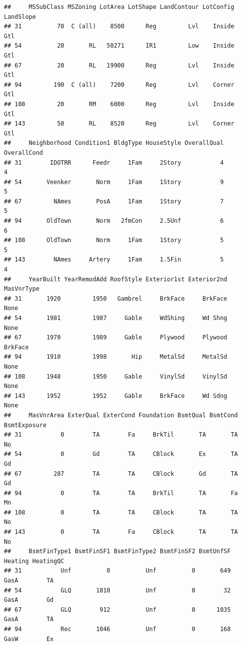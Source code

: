 \documentclass[
]{article}
\begin{document}
\begin{verbatim}
##     MSSubClass MSZoning LotArea LotShape LandContour LotConfig LandSlope
## 31          70  C (all)    8500      Reg         Lvl    Inside       Gtl
## 54          20       RL   50271      IR1         Low    Inside       Gtl
## 67          20       RL   19900      Reg         Lvl    Inside       Gtl
## 94         190  C (all)    7200      Reg         Lvl    Corner       Gtl
## 108         20       RM    6000      Reg         Lvl    Inside       Gtl
## 143         50       RL    8520      Reg         Lvl    Corner       Gtl
##     Neighborhood Condition1 BldgType HouseStyle OverallQual OverallCond
## 31        IDOTRR      Feedr     1Fam     2Story           4           4
## 54       Veenker       Norm     1Fam     1Story           9           5
## 67         NAmes       PosA     1Fam     1Story           7           5
## 94       OldTown       Norm   2fmCon     2.5Unf           6           6
## 108      OldTown       Norm     1Fam     1Story           5           5
## 143        NAmes     Artery     1Fam     1.5Fin           5           4
##     YearBuilt YearRemodAdd RoofStyle Exterior1st Exterior2nd MasVnrType
## 31       1920         1950   Gambrel     BrkFace     BrkFace       None
## 54       1981         1987     Gable     WdShing     Wd Shng       None
## 67       1970         1989     Gable     Plywood     Plywood    BrkFace
## 94       1910         1998       Hip     MetalSd     MetalSd       None
## 108      1948         1950     Gable     VinylSd     VinylSd       None
## 143      1952         1952     Gable     BrkFace     Wd Sdng       None
##     MasVnrArea ExterQual ExterCond Foundation BsmtQual BsmtCond BsmtExposure
## 31           0        TA        Fa     BrkTil       TA       TA           No
## 54           0        Gd        TA     CBlock       Ex       TA           Gd
## 67         287        TA        TA     CBlock       Gd       TA           Gd
## 94           0        TA        TA     BrkTil       TA       Fa           Mn
## 108          0        TA        TA     CBlock       TA       TA           No
## 143          0        TA        Fa     CBlock       TA       TA           No
##     BsmtFinType1 BsmtFinSF1 BsmtFinType2 BsmtFinSF2 BsmtUnfSF Heating HeatingQC
## 31           Unf          0          Unf          0       649    GasA        TA
## 54           GLQ       1810          Unf          0        32    GasA        Gd
## 67           GLQ        912          Unf          0      1035    GasA        TA
## 94           Rec       1046          Unf          0       168    GasW        Ex

\end{verbatim}
\end{document}
